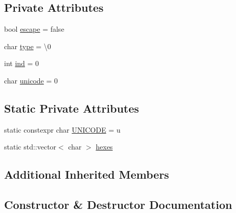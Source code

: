 \subsection*{Private Attributes}
\begin{DoxyCompactItemize}
\item 
bool \mbox{\hyperlink{class_erable_1_1_compiler_1_1_string_token_element_afc14c96d860e5fc072a3f35dc9321611}{escape}} = false
\item 
char \mbox{\hyperlink{class_erable_1_1_compiler_1_1_string_token_element_a6a1bb95be4a02c8a112f8500b5fb423d}{type}} = \textquotesingle{}\textbackslash{}0\textquotesingle{}
\item 
int \mbox{\hyperlink{class_erable_1_1_compiler_1_1_string_token_element_a337ad2e62fe967bd3f81389c5e6dbb32}{ind}} = 0
\item 
char \mbox{\hyperlink{class_erable_1_1_compiler_1_1_string_token_element_a15795cbf25a4ea93c90526e76782f331}{unicode}} = 0
\end{DoxyCompactItemize}
\subsection*{Static Private Attributes}
\begin{DoxyCompactItemize}
\item 
static constexpr char \mbox{\hyperlink{class_erable_1_1_compiler_1_1_string_token_element_acbcfa0e1743cc408c14479c48c72c031}{U\+N\+I\+C\+O\+DE}} = \textquotesingle{}u\textquotesingle{}
\item 
static std\+::vector$<$ char $>$ \mbox{\hyperlink{class_erable_1_1_compiler_1_1_string_token_element_a24c7901a54cbc2317d77abd6a09328e0}{hexes}}
\end{DoxyCompactItemize}
\subsection*{Additional Inherited Members}


\subsection{Constructor \& Destructor Documentation}
\mbox{\label{class_erable_1_1_compiler_1_1_string_token_element_a67cb17bbd6d478c79ac3d9322a574fa7}} 
